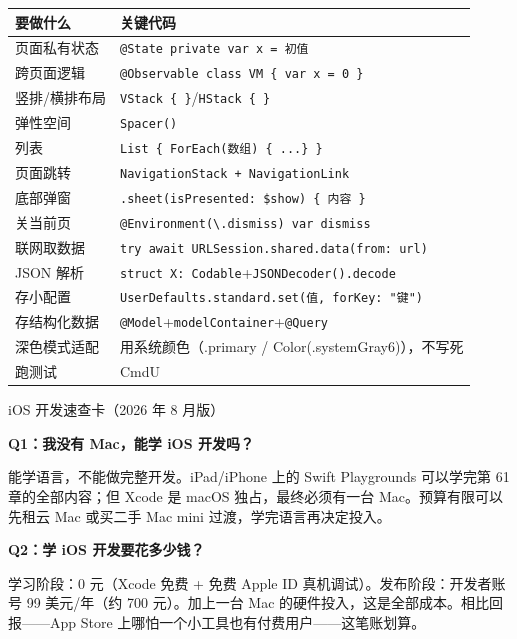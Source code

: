 


\begin{center}
\begin{tabularx}{\linewidth}{|X|X|}
\hline
\textbf{要做什么} & \textbf{关键代码} \tabularnewline
\hline
页面私有状态 & \texttt{@State private var x = 初值} \tabularnewline
跨页面逻辑 & \texttt{@Observable class VM \{ var x = 0 \}} \tabularnewline
竖排/横排布局 & \texttt{VStack \{ \}}/\texttt{HStack \{ \}} \tabularnewline
弹性空间 & \texttt{Spacer()} \tabularnewline
列表 & \texttt{List \{ ForEach(数组) \{ .\allowbreak .\allowbreak .\allowbreak  \} \}} \tabularnewline
页面跳转 & \texttt{NavigationStack + NavigationLink} \tabularnewline
底部弹窗 & \texttt{.\allowbreak sheet(isPresented: \$show) \{ 内容 \}} \tabularnewline
关当前页 & \texttt{@Environment(\textbackslash{}.\allowbreak dismiss) var dismiss} \tabularnewline
联网取数据 & \texttt{try await URLSession.\allowbreak shared.\allowbreak data(from: url)} \tabularnewline
JSON 解析 & \texttt{struct X: Codable}+\texttt{JSONDecoder().\allowbreak decode} \tabularnewline
存小配置 & \texttt{UserDefaults.\allowbreak standard.\allowbreak set(值, forKey: "键")} \tabularnewline
存结构化数据 & \texttt{@Model}+\texttt{modelContainer}+\texttt{@Query} \tabularnewline
深色模式适配 & 用系统颜色（.primary / Color(.systemGray6)），不写死 \tabularnewline
跑测试 & CmdU \tabularnewline
\hline
\end{tabularx}
\end{center}

\begin{center}\small\color{gray}iOS 开发速查卡（2026 年 8 月版）\end{center}


\textbf{Q1：我没有 Mac，能学 iOS 开发吗？}

能学语言，不能做完整开发。iPad/iPhone 上的 Swift Playgrounds 可以学完第 61 章的全部内容；但 Xcode 是 macOS 独占，最终必须有一台 Mac。预算有限可以先租云 Mac 或买二手 Mac mini 过渡，学完语言再决定投入。

\textbf{Q2：学 iOS 开发要花多少钱？}

学习阶段：0 元（Xcode 免费 + 免费 Apple ID 真机调试）。发布阶段：开发者账号 99 美元/年（约 700 元）。加上一台 Mac 的硬件投入，这是全部成本。相比回报——App Store 上哪怕一个小工具也有付费用户——这笔账划算。

